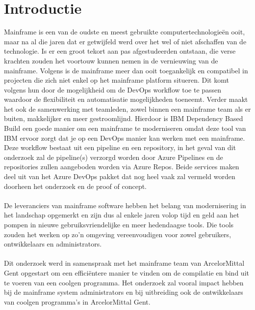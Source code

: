 
\section{Introductie}%
\label{sec:introductie}

Mainframe is een van de oudste en meest gebruikte computertechnologieën ooit, maar na al die jaren dat er getwijfeld werd over het wel of niet afschaffen van de technologie.
Is er een groot tekort aan pas afgestudeerden ontstaan, die verse krachten zouden het voortouw kunnen nemen in de vernieuwing van de mainframe.
Volgens \textcite{Broadcom2024} is de mainframe meer dan ooit toegankelijk en compatibel in projecten die zich niet enkel op het mainframe platform situeren. Dit komt volgens hun door de mogelijkheid om de DevOps workflow toe te passen waardoor de flexibiliteit en automatisatie mogelijkheden toeneemt. Verder maakt het ook de samenwerking met teamleden, zowel binnen een mainframe team als er buiten, makkelijker en meer gestroomlijnd. Hierdoor is IBM Dependency Based Build een goede manier om een mainframe te moderniseren omdat deze tool van IBM ervoor zorgt dat je op een DevOps manier kan werken met een mainframe.
Deze workflow bestaat uit een pipeline en een repository, in het geval van dit onderzoek zal de pipeline(s) verzorgd worden door Azure Pipelines en de repositories zullen aangeboden worden via Azure Repos.
Beide services maken deel uit van het Azure DevOps pakket dat nog heel vaak zal vermeld worden doorheen het onderzoek en de proof of concept.
\\ \\
De leveranciers van mainframe software hebben het belang van modernisering in het landschap opgemerkt en zijn dus al enkele jaren volop tijd en geld aan het pompen in nieuwe gebruiksvriendelijke en meer hedendaagse tools.
Die tools zouden het werken op zo'n omgeving vereenvoudigen voor zowel gebruikers, ontwikkelaars en administrators.
\\ \\
Dit onderzoek werd in samenspraak met het mainframe team van ArcelorMittal Gent opgestart om een efficiëntere manier te vinden om de compilatie en bind uit te voeren van een coolgen programma. Het onderzoek zal vooral impact hebben bij de mainframe system administrators en bij uitbreiding ook de ontwikkelaars van coolgen programma's in ArcelorMittal Gent.
\\ \\
